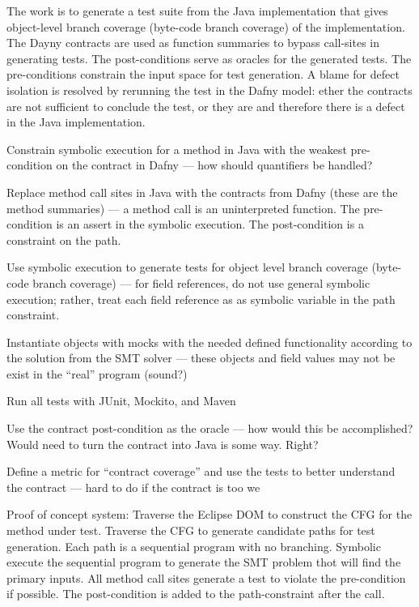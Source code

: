 \documentclass[11pt,onecolumn,notitlepage]{article}
\begin{document}
The work is to generate a test suite from the Java implementation that gives object-level branch coverage (byte-code branch coverage) of the implementation. The Dayny contracts are used as function summaries to bypass call-sites in generating tests. The post-conditions serve as oracles for the generated tests. The pre-conditions constrain the input space for test generation. A blame for defect isolation is resolved by rerunning the test in the Dafny model: ether the contracts are not sufficient to conclude the test, or they are and therefore there is a defect in the Java implementation.

\begin{compactitem}
  \item Constrain symbolic execution for a method in Java with the weakest pre-condition on the contract in Dafny --- how should quantifiers be handled?
  \item Replace method call sites in Java with the contracts from Dafny (these are the method summaries) --- a method call is an uninterpreted function. The pre-condition is an assert in the symbolic execution. The post-condition is a constraint on the path.
  \item Use symbolic execution to generate tests for object level branch coverage (byte-code branch coverage) --- for field references, do not use general symbolic execution; rather, treat each field reference as as symbolic variable in the path constraint. 
  \item Instantiate objects with mocks with the needed defined functionality according to the solution from the SMT solver --- these objects and field values may not be exist in the “real” program (sound?)
  \item Run all tests with JUnit, Mockito, and Maven
  \item Use the contract post-condition as the oracle --- how would this be accomplished? Would need to turn the contract into Java is some way. Right?
  \item Define a metric for “contract coverage” and use the tests to better understand the contract --- hard to do if the contract is too we
\end{compactitem}

Proof of concept system: Traverse the Eclipse DOM to construct the CFG for the method under test. Traverse the CFG to generate candidate paths for test generation. Each path is a sequential program with no branching. Symbolic execute the sequential program to generate the SMT problem thot will find the primary inputs. All method call sites generate a test to violate the pre-condition if possible. The post-condition is added to the path-constraint after the call.
\end{document}
